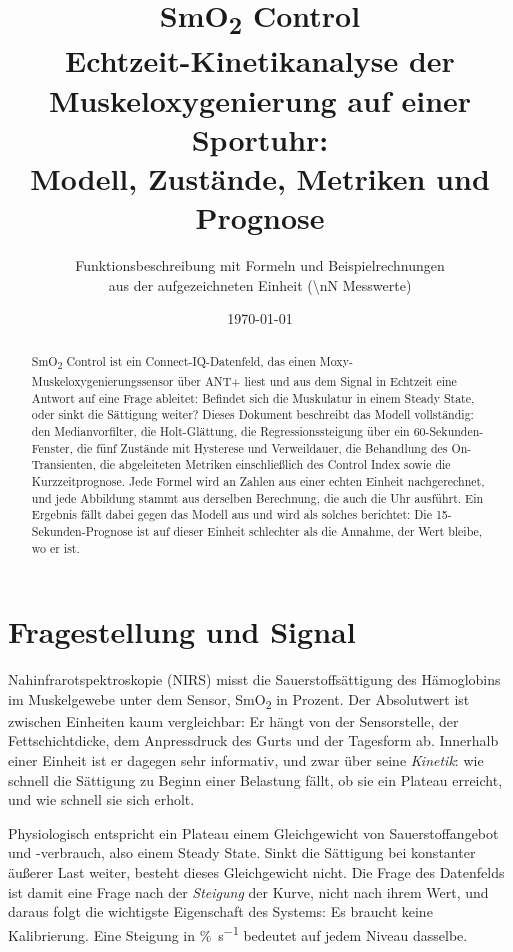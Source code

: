 \documentclass[11pt,a4paper]{article}
\title{\textbf{SmO\textsubscript{2} Control}\\[4pt]
  \large Echtzeit-Kinetikanalyse der Muskeloxygenierung auf einer Sportuhr:\\
  Modell, Zustände, Metriken und Prognose}
\author{Funktionsbeschreibung mit Formeln und Beispielrechnungen\\
  \small aus der aufgezeichneten Einheit \texttt{\nFile} (\num{\nN} Messwerte)}
\date{\today}
\newcommand{\smo}{SmO\textsubscript{2}}
\newcommand{\pers}{\si{\percent\per\second}}
\begin{document}
\maketitle

\begin{abstract}
\noindent
SmO\textsubscript{2} Control ist ein Connect-IQ-Datenfeld, das einen
Moxy-Muskeloxygenierungssensor über ANT+ liest und aus dem Signal in Echtzeit
eine Antwort auf eine Frage ableitet: Befindet sich die Muskulatur in einem
Steady State, oder sinkt die Sättigung weiter? Dieses Dokument beschreibt das
Modell vollständig: den Medianvorfilter, die Holt-Glättung, die
Regressionssteigung über ein 60-Sekunden-Fenster, die fünf Zustände mit
Hysterese und Verweildauer, die Behandlung des On-Transienten, die
abgeleiteten Metriken einschließlich des Control Index sowie die
Kurzzeitprognose. Jede Formel wird an Zahlen aus einer echten Einheit
nachgerechnet, und jede Abbildung stammt aus derselben Berechnung, die auch die
Uhr ausführt. Ein Ergebnis fällt dabei gegen das Modell aus und wird als
solches berichtet: Die 15-Sekunden-Prognose ist auf dieser Einheit schlechter
als die Annahme, der Wert bleibe, wo er ist.
\end{abstract}

\setcounter{tocdepth}{1}
\tableofcontents
\clearpage

\section{Fragestellung und Signal}

Nahinfrarotspektroskopie (NIRS) misst die Sauerstoffsättigung des Hämoglobins
im Muskelgewebe unter dem Sensor, \smo{} in Prozent. Der Absolutwert ist
zwischen Einheiten kaum vergleichbar: Er hängt von der Sensorstelle, der
Fettschichtdicke, dem Anpressdruck des Gurts und der Tagesform ab. Innerhalb
einer Einheit ist er dagegen sehr informativ, und zwar über seine
\emph{Kinetik}: wie schnell die Sättigung zu Beginn einer Belastung fällt, ob
sie ein Plateau erreicht, und wie schnell sie sich erholt.

Physiologisch entspricht ein Plateau einem Gleichgewicht von Sauerstoffangebot
und -verbrauch, also einem Steady State. Sinkt die Sättigung bei konstanter
äußerer Last weiter, besteht dieses Gleichgewicht nicht. Die Frage des
Datenfelds ist damit eine Frage nach der \emph{Steigung} der Kurve, nicht nach
ihrem Wert, und daraus folgt die wichtigste Eigenschaft des Systems: Es braucht
keine Kalibrierung. Eine Steigung in \pers{} bedeutet auf jedem Niveau
dasselbe.
\end{document}
